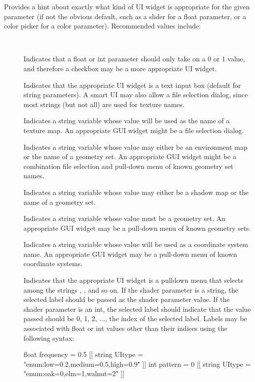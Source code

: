 \documentclass[11pt,letterpaper]{book}
\def\color{{\cf color}\xspace}
\def\float{{\cf float}\xspace}
\def\inttype{{\cf int}\xspace}
\begin{document}
Provides a hint about exactly what kind of UI widget is appropriate for
the given parameter (if not the obvious default, such as a slider for a
\float parameter, or a color picker for a \color parameter).  Recommended
values include:

\vspace{-12pt}
\begin{description}
\item[] \spc
\item[\rm \halfspc ~ ] Indicates that a \float or {\cf int}
  parameter should only take on a 0 or 1 value, and therefore a checkbox
  may be a more appropriate UI widget.
\item[\rm {}] Indicates that the appropriate UI widget is a text
  input box (default for string parameters).  A smart UI may also allow
  a file selection dialog, since most strings (but not all) are used
  for texture names.
\item[\rm {}] Indicates a string variable whose value will be
  used as the name of a texture map.  An appropriate GUI widget might
  be a file selection dialog.
\item[\rm {}] Indicates a string variable whose value may
  either be an environment map or the name of a geometry set.  An
  appropriate GUI widget might be a combination file selection and
  pull-down menu of known geometry set names.
\item[\rm {}] Indicates a string variable whose value may
  either be a shadow map or the name of a geometry set.
\item[\rm {}] Indicates a string variable whose value must
  be a geometry set.  An appropriate GUI widget may be a pull-down
  menu of known geometry sets.
\item[\rm {}] Indicates a string variable whose value will be
  used as a coordinate system name.  An appropriate GUI widget may be
  a pull-down menu of known coordinate systems.
\item[\rm {}] Indicates that the appropriate UI
  widget is a pulldown menu that selects among the strings ,
  , and so on.
  If the shader parameter is a {\cf string}, the selected label should be
  passed as the shader parameter value.  If the shader parameter is an
  \inttype, the selected label should indicate that the value passed
  should be 0, 1, 2, ..., the index of the selected label.
  Labels may be associated with \float or {\cf int} values other than
  their indices using the following syntax:
  \begin{code}
    float frequency = 0.5
        [[ string UItype = "enum:low=0.2,medium=0.5,high=0.9" ]]
    int pattern = 0
        [[ string UItype = "enum:oak=0,elm=1,walnut=2" ]]
  \end{code}
\end{description}
\apiend
\end{document}
